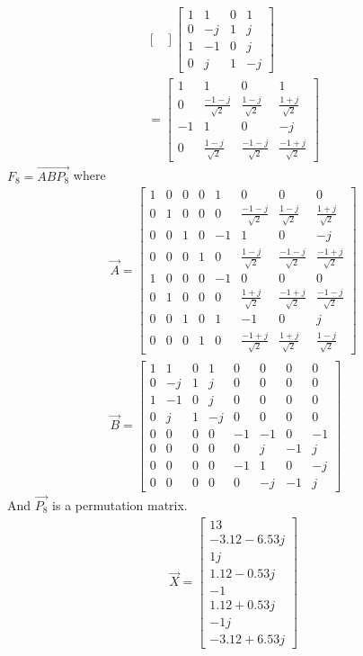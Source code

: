 \documentclass[journal,12pt,twocolumn]{IEEEtran}
\renewcommand\thesection{\arabic{section}}
\begin{document}
\begin{enumerate}[label=\thesection.\arabic*]
\begin{enumerate}[label=\arabic*.,ref=\thesection.\theenumi]
\begin{align}
\begin{bmatrix}
       \end{bmatrix}\begin{bmatrix}
         1&1&0&1\\0&-j&1&j\\1&-1&0&j\\0&j&1&-j
       \end{bmatrix}\\
       =\begin{bmatrix}
         1&1&0&1\\0&\frac{-1-j}{\sqrt{2}}&\frac{1-j}{\sqrt{2}}&\frac{1+j}{\sqrt{2}}\\-1&1&0&-j\\0&\frac{1-j}{\sqrt{2}}&\frac{-1-j}{\sqrt{2}}&\frac{-1+j}{\sqrt{2}}
       \end{bmatrix}
     \end{align}
     $F_8=\vec{ABP_8}$ where
     \begin{align}
       \vec{A}=\begin{bmatrix}
         1&0&0&0&1&0&0&0\\0&1&0&0&0&\frac{-1-j}{\sqrt{2}}&\frac{1-j}{\sqrt{2}}&\frac{1+j}{\sqrt{2}}\\0&0&1&0&-1&1&0&-j\\0&0&0&1&0&\frac{1-j}{\sqrt{2}}&\frac{-1-j}{\sqrt{2}}&\frac{-1+j}{\sqrt{2}}\\1&0&0&0&-1&0&0&0\\0&1&0&0&0&\frac{1+j}{\sqrt{2}}&\frac{-1+j}{\sqrt{2}}&\frac{-1-j}{\sqrt{2}}\\0&0&1&0&1&-1&0&j\\0&0&0&1&0&\frac{-1+j}{\sqrt{2}}&\frac{1+j}{\sqrt{2}}&\frac{1-j}{\sqrt{2}}
       \end{bmatrix}\\ \vec{B}=\begin{bmatrix}
         1&1&0&1&0&0&0&0\\0&-j&1&j&0&0&0&0\\1&-1&0&j&0&0&0&0\\0&j&1&-j&0&0&0&0\\0&0&0&0&-1&-1&0&-1\\0&0&0&0&0&j&-1&j\\0&0&0&0&-1&1&0&-j\\0&0&0&0&0&-j&-1&j
       \end{bmatrix}		
     \end{align}
     And $\vec{P_8}$ is a permutation matrix.
     \begin{align}
       \vec{X}=\begin{bmatrix}
         13\\-3.12-6.53j\\1j\\1.12-0.53j\\-1\\1.12+0.53j\\-1j\\-3.12+6.53j

\end{bmatrix}
\end{align}
\end{enumerate}
\end{enumerate}
\end{document}
